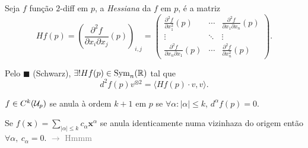 \Ef

\begin{definition}
    Seja \(f\) função \(2\)-diff  em \(p\), a \emph{Hessiana} da \(f\) em \(p\), é a matriz   
    \[ Hf(p) = \left(\frac{\partial^2 f}{\partial x_i\partial x_j}(p)\right)_{i,j} =  \begin{pmatrix}
        \frac{\partial^2 f }{\partial x_1^2}(p) & \cdots &  \frac{\partial^2 f }{\partial x_1 \partial x_n}(p) \\
        \vdots & \ddots & \vdots \\
        \frac{\partial^2 f }{\partial x_n \partial x_1}(p) & \cdots & \frac{\partial^2 f }{\partial x_n^2}(p)
    \end{pmatrix}.\]
\end{definition}
\begin{note}
    Pelo \(\blacksquare\) (Schwarz), \(\exists !Hf(p) \in \operatorname{Sym}_n(\mathbb{R})\) tal que 
    \[d^2f(p)v^{\otimes 2} = \langle Hf(p)\cdot v, v\rangle. \] 
\end{note}

\Ei 

 
\Ef

\begin{definition}
    \(f \in C^{k} (\mathcal{U}_p)\) se anula à ordem \(k+1\) em \(p\) se \(\forall \alpha :  |\alpha|\leq k\), \( d^\alpha f (p)=0\). 
\end{definition}

\Ei

\begin{exercise}
    Se \(f(\textbf{x})= \sum_{|\alpha|\leq k} c_\alpha \textbf{x}^\alpha \) se anula identicamente numa vizinhaza do origem então \(\forall \alpha, \ c_\alpha = 0\). \textcolor{gray}{\(\rightarrow \) Hmmm }
\end{exercise}

\Ef

